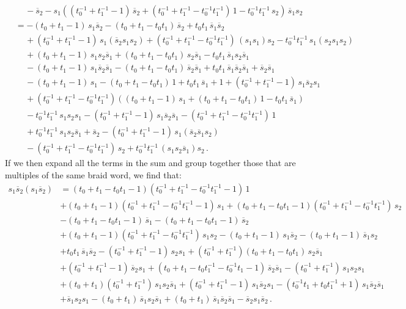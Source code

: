 \documentclass[12pt,reqno]{amsart}
\theoremstyle{definition}
\def\hs{\overline{s}}
\begin{document}
\begin{align*}
&\phantom{sii} - \hs_2 
- s_1((t_0^{-1} + t_1^{-1} -1) \, \hs_2 +(t_0^{-1} + t_1^{-1}
- t_0^{-1} t_1^{-1}) \, 1 - t_0^{-1} t_1^{-1} \, s_2)\, \hs_1 s_2 \\
&  =  -(t_0 + t_1 -1) \, s_1 \hs_2 -(t_0 + t_1 -t_0 t_1) \, \hs_2
+ t_0 t_1 \, \hs_1 \hs_2  \\
&\phantom{sii} + (t_0^{-1} + t_1^{-1} -1) \, s_1 (\hs_2 s_1 s_2)
+ (t_0^{-1} + t_1^{-1} -t_0^{-1} t_1^{-1}) \, (s_1 s_1) s_2 - t_0^{-1} t_1^{-1}
\, s_1(s_2 s_1 s_2) \\
&\phantom{sii} + (t_0 + t_1 - 1) \, s_1 s_2 \hs_1 + (t_0 + t_1 - t_0 t_1)
\, s_2 \hs_1 - t_0 t_1 \, \hs_1 s_2 \hs_1 \\
&\phantom{sii} - (t_0 + t_1 - 1) \, s_1 \hs_2 \hs_1 - (t_0 + t_1 - t_0 t_1)
\, \hs_2 \hs_1 + t_0 t_1 \, \hs_1 \hs_2 \hs_1 
+ \hs_2 \hs_1\\
&\phantom{sii} - (t_0 + t_1 - 1) \, s_1 - (t_0 + t_1 - t_0 t_1)
\, 1 + t_0 t_1 \, \hs_1 + 1  
+ (t_0^{-1} + t_1^{-1} -1) \, s_1 \hs_2 s_1  \\
&\phantom{sii} + (t_0^{-1} + t_1^{-1} - t_0^{-1} t_1^{-1}) ((t_0 + t_1 -1)
\, s_1 +(t_0 + t_1 - t_0 t_1) \, 1 - t_0 t_1 \, \hs_1) \\
&\phantom{sii} - t_0^{-1} t_1^{-1} \, s_1 s_2 s_1 - (t_0^{-1} + t_1^{-1} - 1)
\, s_1 \hs_2 \hs_1 - (t_0^{-1} + t_1^{-1} - t_0^{-1} t_1^{-1}) \, 1 \\
&\phantom{sii} + t_0^{-1} t_1^{-1} \, s_1 s_2 \hs_1 + \hs_2
- (t_0^{-1} + t_1^{-1} - 1) \,s_1 (\hs_2 \hs_1 s_2)\\
&\phantom{sii} - (t_0^{-1} + t_1^{-1} - t_0^{-1} t_1^{-1}) \,s_2
+ t_0^{-1} t_1^{-1} \, (s_1 s_2 \hs_1) s_2 \,.
\end{align*}
If we then expand all the terms in the sum and group together those that are
multiples of the same braid word, we find that:
\begin{align*}
s_1 \hs_2 (s_1 \hs_2)
& = (t_0 + t_1 - t_0 t_1 - 1) (t_0^{-1} + t_1^{-1} - t_0^{-1} t_1^{-1} -1) \, 1 \\
& + (t_0 + t_1 -1) (t_0^{-1} + t_1^{-1} - t_0^{-1} t_1^{-1} -1) \, s_1
+ (t_0 + t_1 - t_0 t_1 -1) (t_0^{-1} + t_1^{-1} - t_0^{-1} t_1^{-1}) \, s_2 \\
& - (t_0 + t_1 - t_0 t_1 - 1) \, \hs_1 - (t_0 + t_1 - t_0 t_1 - 1) \, \hs_2 \\
& + (t_0 + t_1 -1) (t_0^{-1} + t_1^{-1} - t_0^{-1} t_1^{-1}) \, s_1 s_2
- (t_0 + t_1 -1) \, s_1 \hs_2  - (t_0 + t_1 -1) \, \hs_1 s_2 \\
& + t_0 t_1 \, \hs_1 \hs_2 - (t_0^{-1} + t_1^{-1} -1) \, s_2 s_1
+ (t_0^{-1} + t_1^{-1}) (t_0 + t_1 - t_0 t_1) \, s_2 \hs_1\\
& + (t_0^{-1} + t_1^{-1} -1) \, \hs_2 s_1 + (t_0 + t_1 - t_0 t_1^{-1}
- t_0^{-1} t_1 -1) \, \hs_2 \hs_1 - (t_0^{-1} + t_1^{-1}) \, s_1 s_2 s_1 \\
& + (t_0 + t_1) (t_0^{-1} + t_1^{-1}) \, s_1 s_2 \hs_1
+ (t_0^{-1} + t_1^{-1} -1) \, s_1 \hs_2 s_1
- (t_0^{-1} t_1 + t_0 t_1^{-1} +1) \, s_1 \hs_2 \hs_1\\
& + \hs_1 s_2 s_1 - (t_0 + t_1) \, \hs_1 s_2 \hs_1
+ (t_0 + t_1) \, \hs_1 \hs_2 \hs_1  - \hs_2 s_1 \hs_2 \,.
\end{align*}
\end{document}
